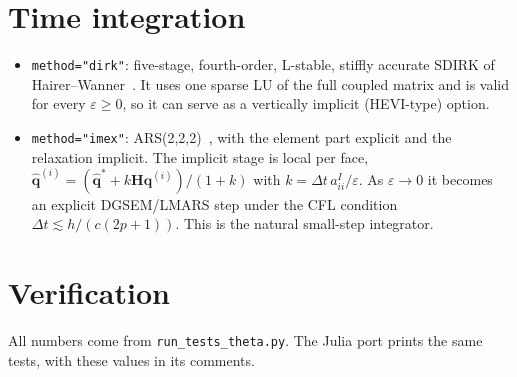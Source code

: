\documentclass[11pt,a4paper]{article}
\newcommand{\qh}{\hat{\bm q}}
\newcommand{\q}{\bm q}
\begin{document}
\section{Time integration}
\begin{itemize}
\item \texttt{method="dirk"}: five-stage, fourth-order, L-stable, stiffly accurate SDIRK of
Hairer--Wanner~\cite{hairer}. It uses one sparse LU of the full coupled matrix and is valid for
every $\varepsilon\ge0$, so it can serve as a vertically implicit (HEVI-type) option.
\item \texttt{method="imex"}: ARS(2,2,2)~\cite{ars}, with the element part explicit and the
relaxation implicit. The implicit stage is local per face,
$\qh^{(i)}=(\qh^\ast+k\bm H\q^{(i)})/(1+k)$ with $k=\Delta t\,a^I_{ii}/\varepsilon$. As
$\varepsilon\to0$ it becomes an explicit DGSEM/LMARS step under the CFL condition
$\Delta t\lesssim h/(c(2p+1))$. This is the natural small-step integrator.
\end{itemize}

\section{Verification}\label{sec:stab}
All numbers come from \texttt{run\_tests\_theta.py}. The Julia port prints the same tests, with
these values in its comments.
\end{document}
